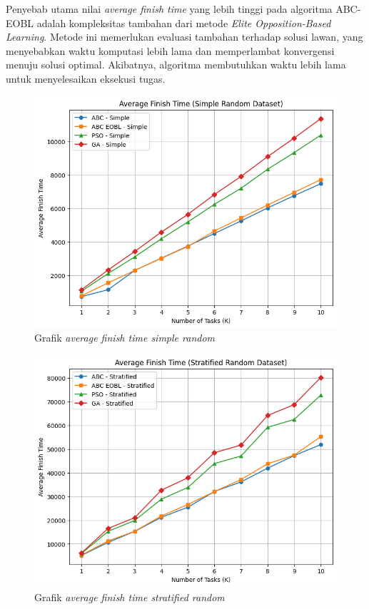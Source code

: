 Penyebab utama nilai \textit{average finish time} yang lebih tinggi pada algoritma ABC-EOBL adalah kompleksitas tambahan dari metode \textit{Elite Opposition-Based Learning}. Metode ini memerlukan evaluasi tambahan terhadap solusi lawan, yang menyebabkan waktu komputasi lebih lama dan memperlambat konvergensi menuju solusi optimal. Akibatnya, algoritma membutuhkan waktu lebih lama untuk menyelesaikan eksekusi tugas.

\begin{figure} [H]
    \centering
    \includegraphics[width=0.75\linewidth]{gambar/Grafik Average Finish Time Simple Random.png}
    \caption{Grafik \textit{average finish time simple random}}
\end{figure}

\newpage

\begin{figure} [H]
    \centering
    \includegraphics[width=0.75\linewidth]{gambar/Grafik Average Finish Time Stratified Random.png}
    \caption{Grafik \textit{average finish time stratified random}}
\end{figure}

